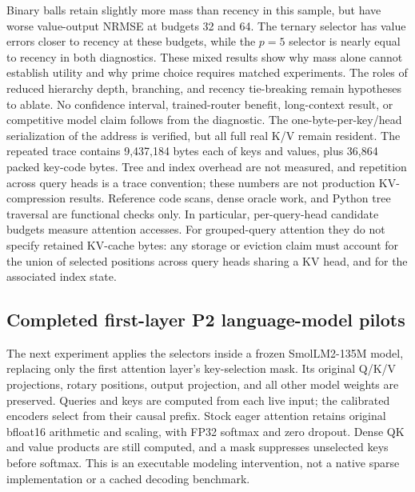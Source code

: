 \documentclass[11pt]{article}
\begin{document}
Binary balls retain slightly more mass than recency in this sample, but have
worse value-output NRMSE at budgets 32 and 64. The ternary selector has value
errors closer to recency at these budgets, while the \(p=5\) selector is nearly
equal to recency in both diagnostics. These mixed results show why mass alone
cannot establish utility and why prime choice requires matched experiments.
The roles of reduced hierarchy depth, branching, and recency tie-breaking
remain hypotheses to ablate. No confidence interval, trained-router benefit,
long-context result, or competitive model claim follows from the diagnostic.
The one-byte-per-key/head serialization of the address is verified, but all
full real K/V remain resident. The repeated trace contains 9,437,184 bytes each
of keys and values, plus 36,864 packed key-code bytes. Tree and index overhead
are not measured, and repetition across query heads is a trace convention;
these numbers are not production KV-compression results. Reference code scans,
dense oracle work, and Python tree traversal are functional checks only.
In particular, per-query-head candidate budgets measure attention accesses.
For grouped-query attention they do not specify retained KV-cache bytes:
any storage or eviction claim must account for the union of selected positions
across query heads sharing a KV head, and for the associated index state.

\subsection{Completed first-layer P2 language-model pilots}

The next experiment applies the selectors inside a frozen SmolLM2-135M model,
replacing only the first attention layer's key-selection mask. Its original
Q/K/V projections, rotary positions, output projection, and all other model
weights are preserved. Queries and keys are computed from each live input;
the calibrated encoders select from their causal prefix. Stock eager attention
retains original bfloat16 arithmetic and scaling, with FP32 softmax and zero
dropout. Dense QK and value products are still computed, and a mask suppresses
unselected keys before softmax. This is an executable modeling intervention,
not a native sparse implementation or a cached decoding benchmark.
\end{document}
